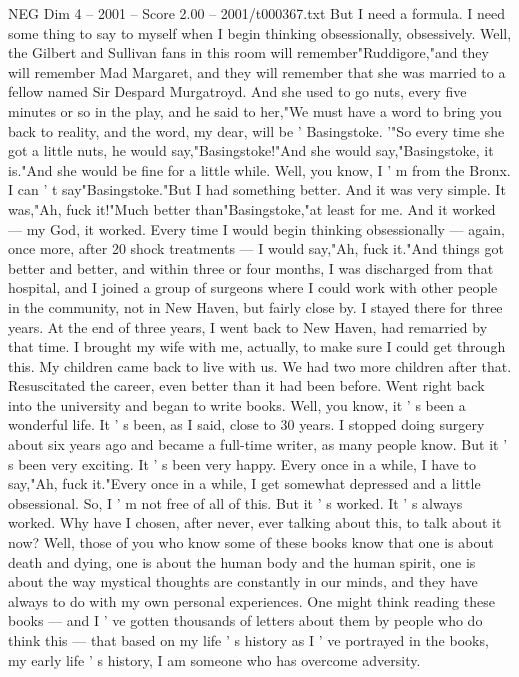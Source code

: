 \begin{textsample}{NEG Dim 4 – 2001 – Score 2.00 – 2001/t000367.txt}
But I need a formula.
I need some thing to say to myself when I begin thinking obsessionally, obsessively.
Well, the Gilbert and Sullivan fans in this room will remember"Ruddigore,"and they will remember Mad Margaret, and they will remember that she was married to a fellow named Sir Despard Murgatroyd.
And she used to go nuts, every five minutes or so in the play, and he said to her,"We must have a word to bring you back to reality, and the word, my dear, will be ' Basingstoke. '"So every time she got a little nuts, he would say,"Basingstoke!"And she would say,"Basingstoke, it is."And she would be fine for a little while.
Well, you know, I ' m from the Bronx.
I can ' t say"Basingstoke."But I had something better.
And it was very simple.
It was,"Ah, fuck it!"Much better than"Basingstoke,"at least for me.
And it worked — my God, it worked.
Every time I would begin thinking obsessionally — again, once more, after 20 shock treatments — I would say,"Ah, fuck it."And things got better and better, and within three or four months, I was discharged from that hospital, and I joined a group of surgeons where I could work with other people in the community, not in New Haven, but fairly close by.
I stayed there for three years.
At the end of three years, I went back to New Haven, had remarried by that time.
I brought my wife with me, actually, to make sure I could get through this.
My children came back to live with us.
We had two more children after that.
Resuscitated the career, even better than it had been before.
Went right back into the university and began to write books.
Well, you know, it ' s been a wonderful life.
It ' s been, as I said, close to 30 years.
I stopped doing surgery about six years ago and became a full-time writer, as many people know.
But it ' s been very exciting.
It ' s been very happy.
Every once in a while, I have to say,"Ah, fuck it."Every once in a while, I get somewhat depressed and a little obsessional.
So, I ' m not free of all of this.
But it ' s worked.
It ' s always worked.
Why have I chosen, after never, ever talking about this, to talk about it now?
Well, those of you who know some of these books know that one is about death and dying, one is about the human body and the human spirit, one is about the way mystical thoughts are constantly in our minds, and they have always to do with my own personal experiences.
One might think reading these books — and I ' ve gotten thousands of letters about them by people who do think this — that based on my life ' s history as I ' ve portrayed in the books, my early life ' s history, I am someone who has overcome adversity.

\end{textsample}
